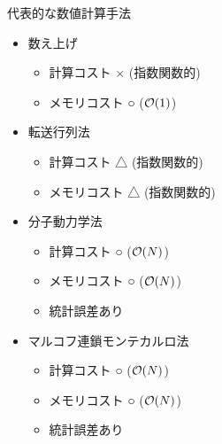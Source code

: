 \begin{frame}[t,fragile]{代表的な数値計算手法}
  \begin{itemize}
  \item 数え上げ
    \begin{itemize}
      \item 計算コスト × (指数関数的)
      \item メモリコスト ○ (${\cal O}(1)$)
    \end{itemize}
  \item 転送行列法
    \begin{itemize}
      \item 計算コスト △ (指数関数的)
      \item メモリコスト △ (指数関数的)
    \end{itemize}
  \item 分子動力学法
    \begin{itemize}
      \item 計算コスト ○ (${\cal O}(N)$)
      \item メモリコスト ○ (${\cal O}(N)$)
      \item 統計誤差あり
    \end{itemize}
  \item {\color{red}マルコフ連鎖モンテカルロ法}
    \begin{itemize}
      \item 計算コスト ○ (${\cal O}(N)$)
      \item メモリコスト ○ (${\cal O}(N)$)
      \item 統計誤差あり
    \end{itemize}
  \end{itemize}
\end{frame}

